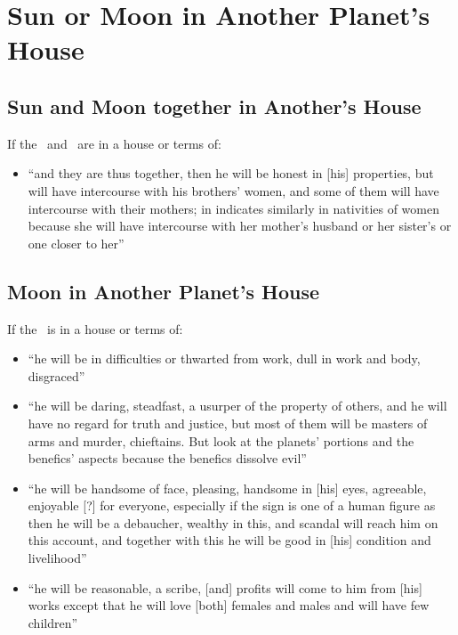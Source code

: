 \section{Sun or Moon in Another Planet's House}
\subsection{Sun and Moon together in Another's House}
If the \Sun\, and \Moon\, are in a house or terms of:
\begin{itemize}[topsep=0em,itemsep=0em]
\item[\Jupiter] ``and they are thus together, then he will be honest in [his] properties, but will have intercourse with his brothers' women, and some of them will have intercourse with their mothers; in indicates similarly in nativities of women because she will have intercourse with her mother's husband or her sister's or one closer to her''
\end{itemize}

\subsection{Moon in Another Planet's House}
If the \Moon\, is in a house or terms of:
\begin{itemize}[topsep=0em,itemsep=0em]
\item[\Saturn] ``he will be in difficulties or thwarted from work, dull in work and body, disgraced''

\item[\Mars] ``he will be daring, steadfast, a usurper of the property of others, and he will have no regard for truth and justice, but most of them will be masters of arms and murder, chieftains. \mndl But look at the planets' portions and the benefics' aspects because the benefics dissolve evil''

\item[\Venus] ``he will be handsome of face, pleasing, handsome in [his] eyes, agreeable, enjoyable [?] for everyone, especially if the sign is one of a human figure as then he will be a debaucher, wealthy in this, and scandal will reach him on this account, and together with this he will be good in [his] condition and livelihood''

\item[\Mercury] ``he will be reasonable, a scribe, [and] profits will come to him from [his] works except that he will love [both] females and males and will have few children''
\end{itemize}

